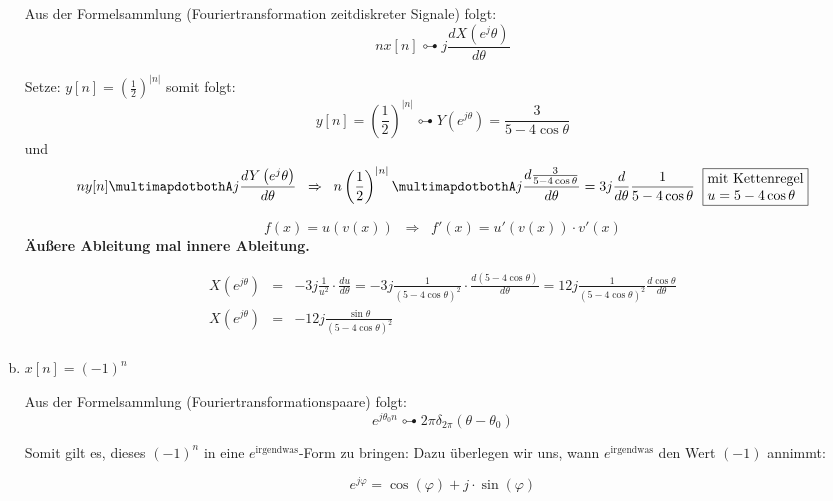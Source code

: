 \begin{uebsp}
\begin{Answer}
\begin{enumerate}[a)]
            \begin{uebsp_theory}
                Aus der Formelsammlung (Fouriertransformation zeitdiskreter
                Signale) folgt:
                \[nx[n]\multimapdotbothA j\frac{dX\left(e^j\theta\right)}{d\theta}\]
            \end{uebsp_theory}
            Setze: $y[n]=\left(\frac{1}{2}\right)^{|n|}$ somit folgt:
            \[y[n]=\left(\frac{1}{2}\right)^{|n|}\multimapdotbothA
            Y\left(e^{j\theta}\right) = \frac{3}{5-4\cos\theta}\]
            und 
            \[ny[n]\multimapdotbothA
                    j\frac{dY\left(e^j\theta\right)}{d\theta}\;\;\Rightarrow\;\;
                n\left(\frac{1}{2}\right)^{|n|}\multimapdotbothA
            j\frac{d\frac{3}{5-4\cos\theta}}{d\theta}
            =3j\frac{d}{d\theta}\frac{1}{5-4\cos\theta}\;\;\fbox{\begin{minipage}{0.2\linewidth}mit Kettenregel
        $u=5-4\cos\theta$\end{minipage}}\]
        \begin{definition}[Kettenregel]
            \[f(x)=u(v(x))\;\;\Rightarrow\;\;f'(x)=u'(v(x))\cdot v'(x)\]
            \textbf{Äußere Ableitung mal innere Ableitung.}
        \end{definition}
        \begin{eqnarray*}
            X\left(e^{j\theta}\right)&=&-3j\frac{1}{u^2}\cdot
            \frac{du}{d\theta}=-3j\frac{1}{\left(5-4\cos\theta\right)^2}\cdot
            \frac{d(5-4\cos\theta)}{d\theta}=12j\frac{1}{(5-4\cos\theta)^2}\frac{d\cos\theta}{d\theta}\\
            X\left(e^{j\theta}\right)&=&-12j\frac{\sin\theta}{(5-4\cos\theta)^2}\\
        \end{eqnarray*}
        \item $\displaystyle x[n]=(-1)^n$
            \begin{uebsp_theory}
                Aus der Formelsammlung (Fouriertransformationspaare) folgt:
                \[e^{j\theta_0n}\multimapdotbothA
                2\pi\delta_{2\pi}(\theta-\theta_0)\]
            \end{uebsp_theory}
            Somit gilt es, dieses $(-1)^n$ in eine $e^\text{irgendwas}$-Form zu
            bringen: Dazu überlegen wir uns, wann $e^\text{irgendwas}$ den Wert
            $(-1)$ annimmt:
            \begin{definition}
                \[e^{j\varphi}=\cos(\varphi)+j\cdot\sin(\varphi)\]
            \end{definition}

\end{enumerate}
\end{Answer}
\end{uebsp}
